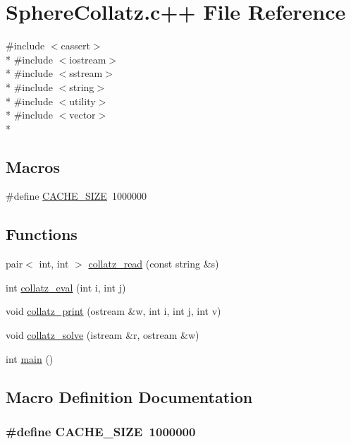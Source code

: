 \hypertarget{SphereCollatz_8c_09_09}{\section{Sphere\-Collatz.\-c++ File Reference}
\label{SphereCollatz_8c_09_09}
}
{\ttfamily \#include $<$cassert$>$}\\*
{\ttfamily \#include $<$iostream$>$}\\*
{\ttfamily \#include $<$sstream$>$}\\*
{\ttfamily \#include $<$string$>$}\\*
{\ttfamily \#include $<$utility$>$}\\*
{\ttfamily \#include $<$vector$>$}\\*
\subsection*{Macros}
\begin{DoxyCompactItemize}
\item 
\#define \hyperlink{SphereCollatz_8c_09_09_a8a6befd630ea1c2ab260266f7466540c}{C\-A\-C\-H\-E\-\_\-\-S\-I\-Z\-E}~1000000
\end{DoxyCompactItemize}
\subsection*{Functions}
\begin{DoxyCompactItemize}
\item 
pair$<$ int, int $>$ \hyperlink{SphereCollatz_8c_09_09_a2772f8a734aeab48332eb3b282f991ba}{collatz\-\_\-read} (const string \&s)
\item 
int \hyperlink{SphereCollatz_8c_09_09_a0b0d3827a619c18aa4d96b8ee8b1c47d}{collatz\-\_\-eval} (int i, int j)
\item 
void \hyperlink{SphereCollatz_8c_09_09_aeda0b7ea3e40e1e7487ccc436f33a559}{collatz\-\_\-print} (ostream \&w, int i, int j, int v)
\item 
void \hyperlink{SphereCollatz_8c_09_09_a0ac646d2122741f9a9a52201bf9551cc}{collatz\-\_\-solve} (istream \&r, ostream \&w)
\item 
int \hyperlink{SphereCollatz_8c_09_09_ae66f6b31b5ad750f1fe042a706a4e3d4}{main} ()
\end{DoxyCompactItemize}


\subsection{Macro Definition Documentation}
\hypertarget{SphereCollatz_8c_09_09_a8a6befd630ea1c2ab260266f7466540c}{
\subsubsection[{C\-A\-C\-H\-E\-\_\-\-S\-I\-Z\-E}]{\setlength{\rightskip}{0pt plus 5cm}\#define C\-A\-C\-H\-E\-\_\-\-S\-I\-Z\-E~1000000}}\label{SphereCollatz_8c_09_09_a8a6befd630ea1c2ab260266f7466540c}


